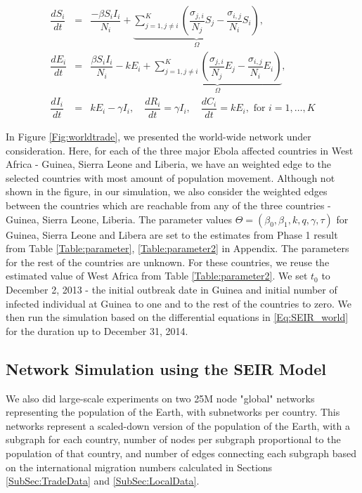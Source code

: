 \documentclass[10pt, journal,onecolumn]{IEEEtran}
\begin{document}
\begin{eqnarray}
\dfrac{dS_{i}}{dt}&=&\dfrac{-\beta S_{i}I_{i}}{N_{i}}+\underset{\Omega}{\underbrace{\sum_{j=1,j\neq i}^{K}\left(\dfrac{\sigma_{j,i}}{N_{j}}S_{j}-\dfrac{\sigma_{i,j}}{N_{i}}S_{i}\right)}},\nonumber \\
\dfrac{dE_{i}}{dt}&=&\dfrac{\beta S_{i}I_{i}}{N_{i}}-kE_{i}+\underset{\Omega}{\underbrace{\sum_{j=1,j\neq i}^{K}\left(\dfrac{\sigma_{j,i}}{N_{j}}E_{j}-\dfrac{\sigma_{i,j}}{N_{i}}E_{i}\right)}},\nonumber \\
\dfrac{dI_{i}}{dt}&=& kE_{i}-\gamma I_{i},
\quad
\dfrac{dR_i}{dt}	=	\gamma I_i,
\quad
\dfrac{dC_i}{dt}	=	kE_i, \text{  for } i=1,\ldots, K
\label{Eq:SEIR_world}
\end{eqnarray}

In Figure \ref{Fig:worldtrade}, we presented the world-wide network under consideration. Here, for each of the three major Ebola affected countries in West Africa - Guinea, Sierra Leone and Liberia, we have an weighted edge to the selected countries with most amount of population movement. Although not shown in the figure, in our simulation, we also consider the weighted edges between the countries which are reachable from any of the three countries -  Guinea, Sierra Leone,  Liberia.  The parameter values $\Theta=(\beta_0,\beta_1,k,q,\gamma, \tau)$ for Guinea, Sierra Leone and Libera are set to the estimates from Phase 1 result from Table \ref{Table:parameter}, \ref{Table:parameter2} in Appendix. The parameters for the rest of the countries are unknown. For these countries, we reuse the estimated value of West Africa from Table \ref{Table:parameter2}. We set $t_0$ to December 2, 2013 - the initial outbreak date in Guinea and initial number of infected individual at Guinea to one and to the rest of the countries to zero. We then run the simulation based on the differential equations in \eqref{Eq:SEIR_world} for the duration up to December 31, 2014.

\subsection{{Network Simulation using the SEIR Model}}
\label{SubSec:GraphX}

We also did large-scale experiments on two 25M node "global" networks representing the population
of the Earth, with subnetworks per country. This networks represent a scaled-down version of the
population of the Earth, with a subgraph for each country, number of nodes per subgraph proportional
to the population of that country, and number of edges connecting each subgraph based on the
international migration numbers calculated in Sections \ref{SubSec:TradeData} and \ref{SubSec:LocalData}.
\end{document}
